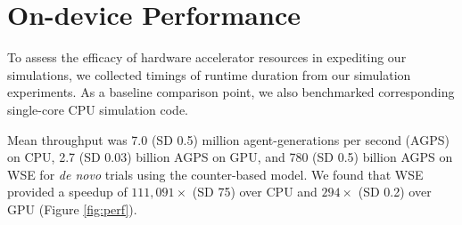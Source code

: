 % 


\section{On-device Performance}
\label{sec:performance}



To assess the efficacy of hardware accelerator resources in expediting our simulations, we collected timings of runtime duration from our simulation experiments.
As a baseline comparison point, we also benchmarked corresponding single-core CPU simulation code.

Mean throughput was 7.0 (SD 0.5) million agent-generations per second (AGPS) on CPU, 2.7 (SD 0.03) billion AGPS on GPU, and 780 (SD 0.5) billion AGPS on WSE for \textit{de novo} trials using the counter-based model.
We found that WSE provided a speedup of $111,091\times$ (SD 75) over CPU and $294\times$ (SD 0.2) over GPU (Figure \ref{fig:perf}).

